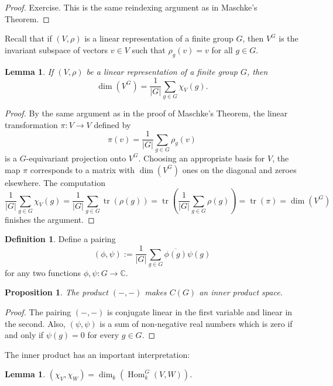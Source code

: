 \documentclass[12pt]{article}
\theoremstyle{plain}
\newtheorem{lemma}[theorem]{Lemma}
\newtheorem{proposition}[theorem]{Proposition}
\theoremstyle{definition}
\newtheorem{definition}[theorem]{Definition}
\theoremstyle{remark}
\numberwithin{equation}{section}
\begin{document}
\begin{proof}
Exercise.  This is the same reindexing argument as in Maschke's Theorem.
\end{proof}

Recall that if $(V,\rho)$ is a linear representation of a finite group $G$,
then $V^G$ is the invariant subspace of vectors
$v \in V$ such that $\rho_g(v)=v$ for all $g \in G$.

\begin{lemma}
If $(V,\rho)$ be a linear representation of a finite group $G$,
then
\[ \dim(V^G) = \frac{1}{|G|} \sum_{g \in G} \chi_V(g). \]
\end{lemma}

\begin{proof}
By the same argument as in the proof of Maschke's Theorem,
the linear transformation $\pi : V \to V$ defined by
\[
\pi(v) = \frac{1}{|G|} \sum_{g \in G} \rho_g(v)
\]
is a $G$-equivariant projection onto $V^G$.
Choosing an appropriate basis for $V$, the map $\pi$ corresponds to a
matrix with $\dim(V^G)$ ones on the diagonal and zeroes elsewhere.
The computation
\[
\frac{1}{|G|} \sum_{g \in G} \chi_V(g)
= \frac{1}{|G|} \sum_{g \in G} \operatorname{tr}( \rho(g) )
= \operatorname{tr}\left( \frac{1}{|G|} \sum_{g \in G}\rho(g) \right)
= \operatorname{tr}( \pi ) = \dim(V^G)
\]
finishes the argument.
\end{proof}

\begin{definition} \label{def:innerProduct}
Define a pairing
\[
( \phi , \psi ) := \frac{1}{|G|}
\sum_{g \in G} \overline{\phi(g)} \psi(g)
\]
for any two functions $\phi, \psi : G \to \mathbb{C}$.
\end{definition}

\begin{proposition}
The product $(-,-)$ makes $C(G)$ an inner product space.
\end{proposition}

\begin{proof}
The pairing $(-,-)$ is conjugate linear in the first variable and linear in
the second.  Also, $(\psi,\psi)$ is a sum of non-negative real numbers
which is zero if and only if $\psi(g)=0$ for every $g \in G$.
\end{proof}


The inner product has an important interpretation:

\begin{lemma}
$\displaystyle
(\chi_V, \chi_W) = \dim_k\left( \operatorname{Hom}^G_k\left(V,
W\right)\right)$.
\end{lemma}
\end{document}

